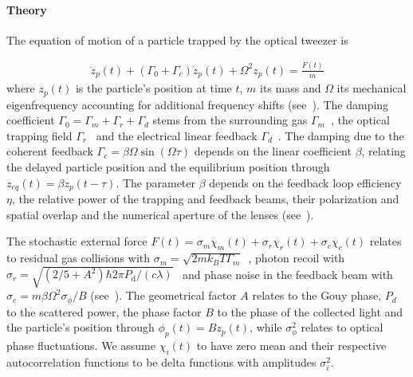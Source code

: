 \documentclass[reprint,aps,prl,superscriptaddress]{revtex4-2}
\begin{document}
\paragraph{Theory}
The equation of motion of a particle trapped by the optical tweezer is

\begin{align}\label{eq:eom}
    \ddot{z}_p(t)+(\Gamma_0+\Gamma_c)\dot{z}_p(t)+\Omega ^2 z_p(t) = \frac{F(t)}{m}
\end{align}
where $z_p(t)$ is the particle's position at time $t$, $m$ its mass and $\Omega$ its mechanical eigenfrequency accounting for additional frequency shifts (see~\cite{SM}). The damping coefficient $\Gamma_0 = \Gamma_m + \Gamma_r+ \Gamma_d$ stems from the surrounding gas $\Gamma_m$~\cite{gieseler2012subkelvin}, the optical trapping field $\Gamma_r$~\cite{jain2016direct} and the electrical linear feedback $\Gamma_d$~\cite{conangla2019optimal}. The damping due to the coherent feedback $\Gamma_c=\beta\Omega\sin(\Omega\tau)$ depends on the linear coefficient $\beta$, relating the delayed particle position and the equilibrium position through $z_{eq}(t)=\beta z_p(t-\tau)$. The parameter $\beta$ depends on the feedback loop efficiency $\eta$, the relative power of the trapping and feedback beams, their polarization and spatial overlap and the numerical aperture of the lenses (see~\cite{SM}).

The stochastic external force $F(t) = \sigma_m \chi_m(t) + \sigma_r \chi_r(t) +  %
\sigma_c \chi_c(t)$ relates to residual gas collisions with $\sigma_m=\sqrt{2m k_B T\Gamma_m}$~\cite{gieseler2012subkelvin}, photon recoil with $\sigma_r=\sqrt{(2/5+A^2)\hbar 2\pi P_\text{d}/( c\lambda)}$~\cite{tebbenjohanns2019optimal} %
and phase noise in the feedback beam with $\sigma_c=m\beta\Omega^2\sigma_\phi/B$ (see~\cite{SM}). The geometrical factor $A$ relates to the Gouy phase, $P_d$ to the scattered power, the phase factor $B$ to the phase of the collected light  and the particle's position through $\phi_p(t)=B z_p(t)$, while $\sigma_\phi^2$ relates to optical phase fluctuations. We assume $\chi_i(t)$ to have zero mean and their respective autocorrelation functions to be delta functions with amplitudes $\sigma_i^2$.
\end{document}

